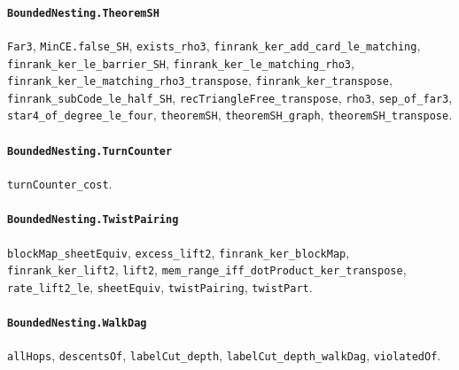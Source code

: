 \paragraph{\texttt{BoundedNesting.TheoremSH}}
{\small\raggedright \texttt{Far3}, \texttt{MinCE.false\_SH}, \texttt{exists\_rho3}, \texttt{finrank\_ker\_add\_card\_le\_matching}, \texttt{finrank\_ker\_le\_barrier\_SH}, \texttt{finrank\_ker\_le\_matching\_rho3}, \texttt{finrank\_ker\_le\_matching\_rho3\_transpose}, \texttt{finrank\_ker\_transpose}, \texttt{finrank\_subCode\_le\_half\_SH}, \texttt{recTriangleFree\_transpose}, \texttt{rho3}, \texttt{sep\_of\_far3}, \texttt{star4\_of\_degree\_le\_four}, \texttt{theoremSH}, \texttt{theoremSH\_graph}, \texttt{theoremSH\_transpose}.\par}

\paragraph{\texttt{BoundedNesting.TurnCounter}}
{\small\raggedright \texttt{turnCounter\_cost}.\par}

\paragraph{\texttt{BoundedNesting.TwistPairing}}
{\small\raggedright \texttt{blockMap\_sheetEquiv}, \texttt{excess\_lift2}, \texttt{finrank\_ker\_blockMap}, \texttt{finrank\_ker\_lift2}, \texttt{lift2}, \texttt{mem\_range\_iff\_dotProduct\_ker\_transpose}, \texttt{rate\_lift2\_le}, \texttt{sheetEquiv}, \texttt{twistPairing}, \texttt{twistPart}.\par}

\paragraph{\texttt{BoundedNesting.WalkDag}}
{\small\raggedright \texttt{allHops}, \texttt{descentsOf}, \texttt{labelCut\_depth}, \texttt{labelCut\_depth\_walkDag}, \texttt{violatedOf}.\par}
